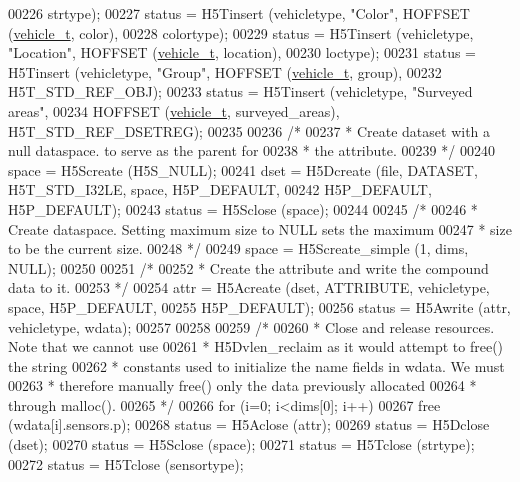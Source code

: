 \begin{DoxyCode}
00226                 strtype);
00227     status = H5Tinsert (vehicletype, \textcolor{stringliteral}{"Color"}, HOFFSET (\hyperlink{structvehicle__t}{vehicle\_t}, color),
00228                 colortype);
00229     status = H5Tinsert (vehicletype, \textcolor{stringliteral}{"Location"}, HOFFSET (\hyperlink{structvehicle__t}{vehicle\_t}, location),
00230                 loctype);
00231     status = H5Tinsert (vehicletype, \textcolor{stringliteral}{"Group"}, HOFFSET (\hyperlink{structvehicle__t}{vehicle\_t}, group),
00232                 H5T\_STD\_REF\_OBJ);
00233     status = H5Tinsert (vehicletype, \textcolor{stringliteral}{"Surveyed areas"},
00234                 HOFFSET (\hyperlink{structvehicle__t}{vehicle\_t}, surveyed\_areas), H5T\_STD\_REF\_DSETREG);
00235 
00236     \textcolor{comment}{/*}
00237 \textcolor{comment}{     * Create dataset with a null dataspace. to serve as the parent for}
00238 \textcolor{comment}{     * the attribute.}
00239 \textcolor{comment}{     */}
00240     space = H5Screate (H5S\_NULL);
00241     dset = H5Dcreate (file, DATASET, H5T\_STD\_I32LE, space, H5P\_DEFAULT,
00242                 H5P\_DEFAULT, H5P\_DEFAULT);
00243     status = H5Sclose (space);
00244 
00245     \textcolor{comment}{/*}
00246 \textcolor{comment}{     * Create dataspace.  Setting maximum size to NULL sets the maximum}
00247 \textcolor{comment}{     * size to be the current size.}
00248 \textcolor{comment}{     */}
00249     space = H5Screate\_simple (1, dims, NULL);
00250 
00251     \textcolor{comment}{/*}
00252 \textcolor{comment}{     * Create the attribute and write the compound data to it.}
00253 \textcolor{comment}{     */}
00254     attr = H5Acreate (dset, ATTRIBUTE, vehicletype, space, H5P\_DEFAULT,
00255                 H5P\_DEFAULT);
00256     status = H5Awrite (attr, vehicletype, wdata);
00257 
00258 
00259     \textcolor{comment}{/*}
00260 \textcolor{comment}{     * Close and release resources.  Note that we cannot use}
00261 \textcolor{comment}{     * H5Dvlen\_reclaim as it would attempt to free() the string}
00262 \textcolor{comment}{     * constants used to initialize the name fields in wdata.  We must}
00263 \textcolor{comment}{     * therefore manually free() only the data previously allocated}
00264 \textcolor{comment}{     * through malloc().}
00265 \textcolor{comment}{     */}
00266     \textcolor{keywordflow}{for} (i=0; i<dims[0]; i++)
00267         free (wdata[i].sensors.p);
00268     status = H5Aclose (attr);
00269     status = H5Dclose (dset);
00270     status = H5Sclose (space);
00271     status = H5Tclose (strtype);
00272     status = H5Tclose (sensortype);

\end{DoxyCode}
